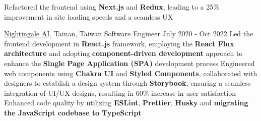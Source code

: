 {    %
    \resumeItem
    {Refactored the frontend using \textbf{Next.js} and \textbf{Redux}, leading to a 25\% improvement in site loading speeds and a seamless UX}
    
  \resumeItemListEnd
}

\resumeExpEntry
{\href{https://19gale.ai}{Nightingale AI.}}
{Tainan, Taiwan}
{Software Engineer}
{July 2020 - Oct 2022}
{
  \resumeItemListStart
    \resumeItem
    {Led the frontend development in \textbf{React.js} framework, employing the \textbf{React Flux architecture} and adopting \textbf{component-driven development} approach to enhance the \textbf{Single Page Application (SPA)} development process}
    \resumeItem
    {Engineered web components using \textbf{Chakra UI} and \textbf{Styled Components}, collaborated with designers to establish a design system through \textbf{Storybook}, ensuring a seamless integration of UI/UX designs, resulting in 60\% increase in user satisfaction}
    \resumeItem
    {Enhanced code quality by utilizing \textbf{ESLint}, \textbf{Prettier}, \textbf{Husky} and \textbf{migrating the JavaScript codebase to TypeScript}}
  \resumeItemListEnd
}

